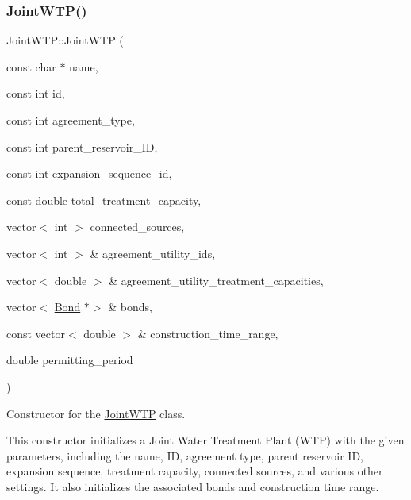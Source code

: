 \subsubsection{\texorpdfstring{Joint\+W\+T\+P()}{JointWTP()}\hspace{0.1cm}{\footnotesize\ttfamily [1/2]}}
{\footnotesize\ttfamily Joint\+W\+T\+P\+::\+Joint\+W\+TP (\begin{DoxyParamCaption}\item[{const char $\ast$}]{name,  }\item[{const int}]{id,  }\item[{const int}]{agreement\+\_\+type,  }\item[{const int}]{parent\+\_\+reservoir\+\_\+\+ID,  }\item[{const int}]{expansion\+\_\+sequence\+\_\+id,  }\item[{const double}]{total\+\_\+treatment\+\_\+capacity,  }\item[{vector$<$ int $>$}]{connected\+\_\+sources,  }\item[{vector$<$ int $>$ \&}]{agreement\+\_\+utility\+\_\+ids,  }\item[{vector$<$ double $>$ \&}]{agreement\+\_\+utility\+\_\+treatment\+\_\+capacities,  }\item[{vector$<$ \mbox{\hyperlink{classBond}{Bond}} $\ast$$>$ \&}]{bonds,  }\item[{const vector$<$ double $>$ \&}]{construction\+\_\+time\+\_\+range,  }\item[{double}]{permitting\+\_\+period }\end{DoxyParamCaption})}



Constructor for the \mbox{\hyperlink{classJointWTP}{Joint\+W\+TP}} class. 

This constructor initializes a Joint Water Treatment Plant (W\+TP) with the given parameters, including the name, ID, agreement type, parent reservoir ID, expansion sequence, treatment capacity, connected sources, and various other settings. It also initializes the associated bonds and construction time range.


